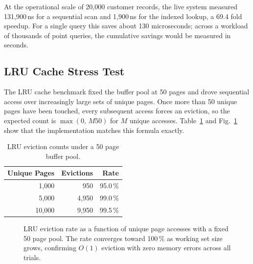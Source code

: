 \documentclass[conference]{IEEEtran}
\begin{document}
At the operational scale of 20,000 customer records, the live system measured
131,900\,ns for a sequential scan and 1,900\,ns for the indexed lookup, a
69.4 fold speedup. For a single query this saves about 130 microseconds; across a
workload of thousands of point queries, the cumulative savings would be measured
in seconds.

\subsection{LRU Cache Stress Test}

The LRU cache benchmark fixed the buffer pool at 50 pages and drove sequential
access over increasingly large sets of unique pages. Once more than 50 unique
pages have been touched, every subsequent access forces an eviction, so the
expected count is $\max(0,\, M   50)$ for $M$ unique accesses. Table~\ref{tab:lru}
and Fig.~\ref{fig:eviction} show that the implementation matches this formula
exactly.

\begin{table}[h]
\centering
\caption{LRU eviction counts under a 50 page buffer pool.}
\label{tab:lru}
\begin{tabular}{rrr}
\toprule
\textbf{Unique Pages} & \textbf{Evictions} & \textbf{Rate} \\
\midrule
1{,}000  &   950 & 95.0\,\% \\
5{,}000  & 4{,}950 & 99.0\,\% \\
10{,}000 & 9{,}950 & 99.5\,\% \\
\bottomrule
\end{tabular}
\end{table}

\begin{figure}[h]
\centering
{}
\caption{LRU eviction rate as a function of unique page accesses with a fixed
50 page pool. The rate converges toward 100\,\% as working set size grows,
confirming $O(1)$ eviction with zero memory errors across all trials.}
\label{fig:eviction}
\end{figure}
\end{document}
